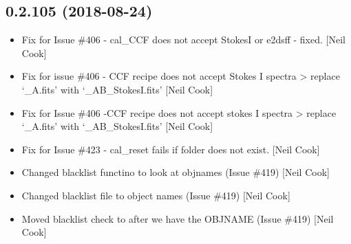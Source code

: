 \documentclass[a4paper,10pt,english]{report}
\begin{document}
\subsection{0.2.105 (2018-08-24)}
\label{\detokenize{misc/changelog:id352}}\begin{itemize}
\item {} 
Fix for Issue \#406 - cal\_CCF does not accept StokesI or e2dsff -
fixed. {[}Neil Cook{]}

\item {} 
Fix for issue \#406 - CCF recipe does not accept Stokes I spectra \textendash{}\textgreater{}
replace ‘\_A.fits’ with ‘\_AB\_StokesI.fits’ {[}Neil Cook{]}

\item {} 
Fix for Issue \#406 -CCF recipe does not accept stokes I spectra \textendash{}\textgreater{}
replace ‘\_A.fits’ with ‘\_AB\_StokesI.fits’ {[}Neil Cook{]}

\item {} 
Fix for Issue \#423 - cal\_reset fails if folder does not exist. {[}Neil
Cook{]}

\item {} 
Changed blacklist functino to look at objnames (Issue \#419) {[}Neil
Cook{]}

\item {} 
Changed blacklist file to object names (Issue \#419) {[}Neil Cook{]}

\item {} 
Moved blacklist check to after we have the OBJNAME (Issue \#419) {[}Neil
Cook{]}

\end{itemize}
\end{document}

